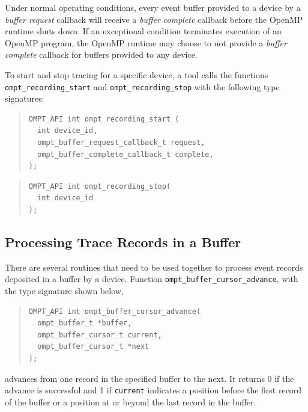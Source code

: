 \documentclass{article}
\begin{document}
Under normal operating conditions, every event buffer provided to a device by a \emph{buffer request} callback will receive a \emph{buffer complete} callback before the OpenMP runtime shuts down. If an exceptional condition terminates  execution of an OpenMP program, the OpenMP runtime may choose to not provide a \emph{buffer complete} callback for buffers provided to any device.

To start and stop tracing for a specific device, a tool calls the functions \verb|ompt_recording_start| and \verb|ompt_recording_stop| with the following type signatures:
\begin{quote}
\begin{verbatim}
OMPT_API int ompt_recording_start (
  int device_id, 
  ompt_buffer_request_callback_t request,
  ompt_buffer_complete_callback_t complete,
);
\end{verbatim}
\end{quote}
\begin{quote}
\begin{verbatim}
OMPT_API int ompt_recording_stop(
  int device_id 
);
\end{verbatim}
\end{quote}

\subsection{Processing Trace Records in a Buffer}
\label{sec:record-data}

There are several routines that need to be used together to process %
event records deposited in a buffer by a device. Function \verb|ompt_buffer_cursor_advance|, with the type signature shown below,

\begin{quote}
\begin{verbatim}
OMPT_API int ompt_buffer_cursor_advance(
  ompt_buffer_t *buffer, 
  ompt_buffer_cursor_t current, 
  ompt_buffer_cursor_t *next
); 
\end{verbatim}
\end{quote}
advances from one record in the specified buffer to the next. It returns 0 if the advance is successful and 1 if \verb|current| indicates a position before the first record of the buffer or a position at or beyond the last record in the buffer.
\end{document}
